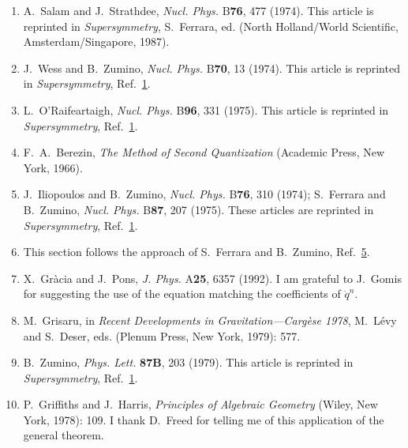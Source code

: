 \begin{enumerate}
  \item {}\label{ch26-ref-1}
  A.~Salam and J.~Strathdee, \textit{Nucl. Phys.} B\textbf{76}, 477
  (1974). This article is reprinted in \textit{Supersymmetry},
  S.~Ferrara, ed. (North Holland/World Scientific,
  Amsterdam/Singapore, 1987).

  \item {}\label{ch26-ref-2}
  J.~Wess and B.~Zumino, \textit{Nucl. Phys.} B\textbf{70}, 13 (1974).
  This article is reprinted in \textit{Supersymmetry},
  Ref.~\hyperref[ch26-ref-1]{1}.

  \item {}\label{ch26-ref-3}
  L.~O'Raifeartaigh, \textit{Nucl. Phys.} B\textbf{96}, 331 (1975).
  This article is reprinted in \textit{Supersymmetry},
  Ref.~\hyperref[ch26-ref-1]{1}.

  \item {}\label{ch26-ref-4}
  F.~A.~Berezin, \textit{The Method of Second Quantization}
  (Academic Press, New York, 1966).

  \item {}\label{ch26-ref-5}
  J.~Iliopoulos and B.~Zumino, \textit{Nucl. Phys.} B\textbf{76}, 310
  (1974); S.~Ferrara and B.~Zumino, \textit{Nucl. Phys.} B\textbf{87},
  207 (1975). These articles are reprinted in \textit{Supersymmetry},
  Ref.~\hyperref[ch26-ref-1]{1}.

  \item {}\label{ch26-ref-6}
  This section follows the approach of S.~Ferrara and B.~Zumino,
  Ref.~\hyperref[ch26-ref-5]{5}.

  \item {}\label{ch26-ref-7}
  X.~Gr\`acia and J.~Pons, \textit{J. Phys.} A\textbf{25}, 6357 (1992).
  I am grateful to J.~Gomis for suggesting the use of the equation
  matching the coefficients of $\dot q^n$.

  \item[7a.] \label{ch26-ref-7a}
  M.~Grisaru, in \textit{Recent Developments in Gravitation---Carg\`ese
  1978}, M.~L\'evy and S.~Deser, eds. (Plenum Press, New York, 1979):
  577.

  \item {}\label{ch26-ref-8}
  B.~Zumino, \textit{Phys. Lett.} \textbf{87B}, 203 (1979). This article
  is reprinted in \textit{Supersymmetry},
  Ref.~\hyperref[ch26-ref-1]{1}.

  \item {}\label{ch26-ref-9}
  P.~Griffiths and J.~Harris, \textit{Principles of Algebraic Geometry}
  (Wiley, New York, 1978): 109. I thank D.~Freed for telling me of this
  application of the general theorem.
\end{enumerate}
